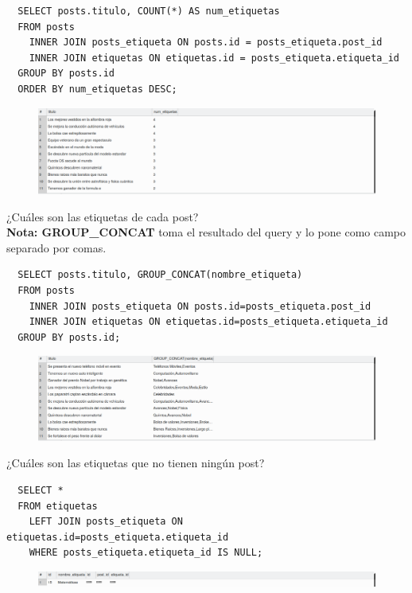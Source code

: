 \documentclass{article}
\begin{document}
\begin{verbatim}
  SELECT posts.titulo, COUNT(*) AS num_etiquetas
  FROM posts
    INNER JOIN posts_etiqueta ON posts.id = posts_etiqueta.post_id
    INNER JOIN etiquetas ON etiquetas.id = posts_etiqueta.etiqueta_id
  GROUP BY posts.id
  ORDER BY num_etiquetas DESC;
\end{verbatim}

\begin{figure}[h!]
  \centering
  \includegraphics[scale=0.5]{./Pictures/135_first_question.png}
\end{figure}

¿Cuáles son las etiquetas de cada post?\\
\textbf{Nota: GROUP\_CONCAT} toma el resultado del query y lo pone como campo
separado por comas.\\

\begin{verbatim}
  SELECT posts.titulo, GROUP_CONCAT(nombre_etiqueta)
  FROM posts
    INNER JOIN posts_etiqueta ON posts.id=posts_etiqueta.post_id
    INNER JOIN etiquetas ON etiquetas.id=posts_etiqueta.etiqueta_id
  GROUP BY posts.id;
\end{verbatim}

\begin{figure}[h!]
  \centering
  \includegraphics[scale=0.5]{./Pictures/136_second_question.png}
\end{figure}


¿Cuáles son las etiquetas que no tienen ningún post?
\begin{verbatim}
  SELECT *
  FROM etiquetas
    LEFT JOIN posts_etiqueta ON etiquetas.id=posts_etiqueta.etiqueta_id
    WHERE posts_etiqueta.etiqueta_id IS NULL;
\end{verbatim}

\begin{figure}[h!]
  \centering
  \includegraphics[scale=0.5]{./Pictures/137_third_question.png}
\end{figure}
\end{document}
